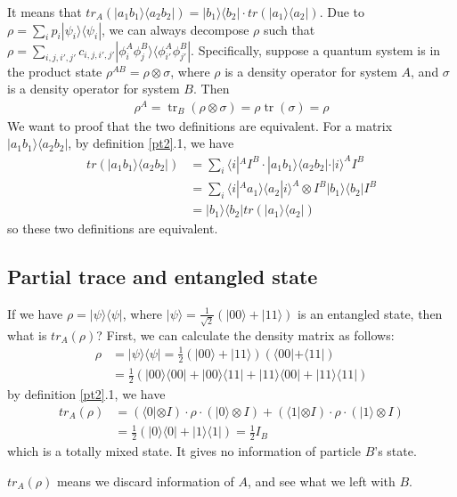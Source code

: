 \documentclass[UTF8,12pt]{article} %
\numberwithin{equation}{section}
\begin{document}
It means that $tr_{A}(|a_{1}b_{1}\rangle\langle a_{2}b_{2}|) = |b_{1}\rangle\langle b_{2}| \cdot tr(|a_{1}\rangle\langle a_{2}|)$. Due to $\rho = \sum_{i}p_{i}|\psi_{i}\rangle\langle\psi_{i}|$, we can always decompose $\rho$ such that $\rho = \sum_{i,j,i',j'} c_{i,j,i',j'} |\phi_{i}^{A} \phi_{j}^{B}\rangle\langle\phi_{i'}^{A} \phi_{j'}^{B}|$. Specifically, suppose a quantum system is in the product state $\rho^{AB} = \rho \otimes \sigma$, where $\rho$ is a density operator for system $A$, and $\sigma$ is a density operator for system $B$. Then
\begin{align}
\rho^{A}=\operatorname{tr}_{B}(\rho \otimes \sigma)=\rho \operatorname{tr}(\sigma)=\rho
\end{align}
We want to proof that the two definitions are equivalent. For a matrix $|a_{1}b_{1}\rangle\langle a_{2}b_{2}|$, by definition \ref{pt2}.1, we have
\begin{align}
tr(|a_{1}b_{1}\rangle\langle a_{2}b_{2}|) &= \sum_{i} \langle i|^{A} I^{B}\cdot |a_{1}b_{1}\rangle\langle a_{2}b_{2}| \cdot |i\rangle^{A} I^{B} \\
&= \sum_{i} \langle i|^{A}a_{1}\rangle\langle a_{2}|i\rangle^{A} \otimes I^{B} |b_{1}\rangle\langle b_{2}| I^{B}\\
&= |b_{1}\rangle\langle b_{2}|tr(|a_{1}\rangle\langle a_{2}|)
\end{align}
so these two definitions are equivalent.

\subsection{Partial trace and entangled state}

If we have $\rho = |\psi\rangle\langle\psi|$, where $|\psi\rangle = \frac{1}{\sqrt{2}}(|00\rangle + |11\rangle)$ is an entangled state, then what is $tr_{A}(\rho)$? First, we can calculate the density matrix as follows:
\begin{align}
\rho &= |\psi\rangle\langle\psi| = \frac{1}{2}(|00\rangle + |11\rangle)(\langle 00| + \langle 11|) \\
&= \frac{1}{2}(|00\rangle\langle00| + |00\rangle\langle11| + |11\rangle\langle00| + |11\rangle\langle11|)
\end{align}
by definition \ref{pt2}.1, we have
\begin{align}
tr_{A}(\rho) &= (\langle0|\otimes I) \cdot \rho \cdot (|0\rangle \otimes I) + (\langle1|\otimes I) \cdot \rho \cdot (|1\rangle \otimes I) \\
&= \frac{1}{2}(|0\rangle\langle0| + |1\rangle\langle1|) = \frac{1}{2} I_{B}
\end{align}
which is a totally mixed state. It gives no information of particle $B$'s state.

\begin{center}
\end{center}

$tr_{A}(\rho)$ means we discard information of $A$, and see what we left with $B$.
\end{document}
